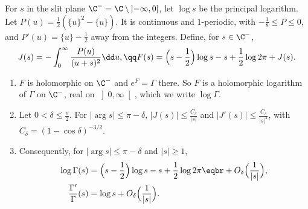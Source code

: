 For $s$ in the slit plane $\C^-=\C\setminus\left]-\infty,0\right]$, let $\log s$ be the principal logarithm. Let $P(u)=\frac12(\{u\}^2-\{u\})$. It is continuous and $1$-periodic, with $-\frac18\le P\le0$, and $P'(u)=\{u\}-\frac12$ away from the integers. Define, for $s\in\C^-$,
\[
\begin{gathered}J(s)=-\int_0^\infty\frac{P(u)}{(u+s)^2}\dd u,\qq F(s)=\Bigl(s-\frac12\Bigr)\log s-s+\frac12\log2\pi+J(s).\end{gathered}
\]

\begin{theorem}\label{thm:stirlingc}
\begin{enumerate}[label=(\alph*)]
\item $F$ is holomorphic on $\C^-$ and $e^{F}=\Gamma$ there. So $F$ is a holomorphic logarithm of $\Gamma$ on $\C^-$, real on $\left]0,\infty\right[$, which we write $\log\Gamma$.
\item Let $0<\delta\le\frac\pi2$. For $|\arg s|\le\pi-\delta$, $|J(s)|\le\frac{C_\delta}{|s|}$ and $|J'(s)|\le\frac{C_\delta}{|s|^2}$, with $C_\delta=(1-\cos\delta)^{-3/2}$.
\item Consequently, for $|\arg s|\le\pi-\delta$ and $|s|\ge1$,
\[
\begin{aligned}\log\Gamma(s)&=\Bigl(s-\frac12\Bigr)\log s-s+\frac12\log2\pi\eqbr+O_\delta\Bigl(\frac1{|s|}\Bigr),\\\frac{\Gamma'}\Gamma(s)&=\log s+O_\delta\Bigl(\frac1{|s|}\Bigr).\end{aligned}
\]
\end{enumerate}
\end{theorem}
